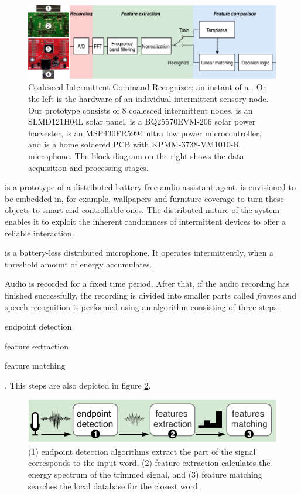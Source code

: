 \begin{figure}
	\centering
	\includegraphics[width=\columnwidth]{figures/cis}
	\caption{Coalesced Intermittent Command Recognizer: an instant of a \fullsys. On the left is the hardware of an individual intermittent sensory node. Our prototype consists of 8 coalesced intermittent nodes.  is an SLMD121H04L solar panel.  is a BQ25570EVM-206 solar power harvester,  is an MSP430FR5994 ultra low power microcontroller, and  is a home soldered PCB with KPMM-3738-VM1010-R microphone. The block diagram on the right shows the data acquisition and processing stages.}
	\label{fig:powerCycle}
\end{figure}

\sys is a prototype of a distributed battery-free audio assistant agent. \sys is envisioned to be embedded in, for example, wallpapers and furniture coverage to turn these objects to smart and controllable ones. The distributed nature of the \sys system enables it to exploit the inherent randomness of intermittent devices to offer a reliable interaction. 

\sys is a battery-less distributed microphone. It operates intermittently, when a threshold amount of energy accumulates.  

Audio is recorded for a fixed time period. After that, if the audio recording has finished successfully, the recording is divided into smaller parts called \textit{frames} and speech recognition is performed using an algorithm consisting of three steps:
\begin{enumerate*}
	\item endpoint detection
	\item feature extraction
	\item feature matching
\end{enumerate*}.
This steps are also depicted in figure \ref{fig:mic}.

\begin{figure}
	\centering
	\includegraphics[width=\columnwidth]{figures/distributedMicrophone}
	\caption{ (1) endpoint detection algorithms extract the part of the signal corresponds to the input word, (2) feature extraction calculates the energy spectrum of the trimmed signal, and (3) feature matching searches the local database for the closest word}
	\label{fig:mic}
\end{figure}

